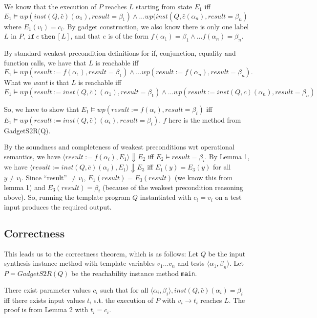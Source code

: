 \documentclass[11pt]{article}
\begin{document}
We know that the execution of $P$ reaches $L$ starting from state $E_1$ iff
$E_1 \vDash wp(inst(Q, \bar{c})(\alpha_1), result = \beta_1) \wedge \ldots
wp(inst(Q,\bar{c}(\alpha_n), result = \beta_n)$ where $E_1(v_i) = c_i$.
%
By gadget construction, we also know there is only one label $L$ in $P$,
$\mathtt{if}~ e~ \mathtt{then}~[L]$, and that $e$ is of the form
$f(\alpha_1) = \beta_1 \wedge \ldots f(\alpha_n) = \beta_n$.

By standard weakest precondition definitions for if, conjunction, equality and
function calls, we have that $L$ is reachable iff
$E_1 \vDash wp(result := f(\alpha_1), result = \beta_1) \wedge \ldots wp(result
:= f(\alpha_n), result = \beta_n).$ What we \emph{want} is that $L$ is reachable
iff
$E_1 \vDash wp( result := inst(Q, \bar{c})(\alpha_1), result = \beta_1) \wedge
\ldots wp(result := inst(Q, c)(\alpha_n), result = \beta_n)$

So, we have to show that $E_1 \vDash wp(result := f(\alpha_i), result =
\beta_i)$ iff $E_1 \vDash wp(result := inst(Q, \bar{c})(\alpha_i), result =
\beta_i)$.  $f$ here is the method from GadgetS2R(Q).  

By the soundness and completeness of weakest preconditions wrt operational
semantics, we have $\langle result := f(\alpha_i), E_1\rangle \Downarrow E_2$
iff $E_2 \vDash result = \beta_i$.
%
By Lemma 1, we have $\langle result := inst(Q, \bar{c})(\alpha_i) ,
E_1 \rangle \Downarrow E_3$ iff $E_1(y)= E_3(y)$ for all $y \neq
v_i$.
%
Since ``result'' $\neq v_i$, $E_1(result) = E_3(result)$ (we know this from
lemma 1) and $E_3(result) = \beta_i$ (because of the weakest precondition
reasoning above). So, running the template program $Q$ instantiated with
$c_i = v_i$ on a test input produces the required output.

\subsection{Correctness}

This leads us to the correctness theorem, which is as follows: Let $Q$ be the
input synthesis instance method with template variables $v_1 ... v_n$ and tests
$\langle\alpha_1, \beta_n\rangle$. Let $P = GadgetS2R(Q)$ be the reachability
instance method \texttt{main}.

There exist parameter values $c_i$ such that for all
$\langle\alpha_i,\beta_i\rangle, inst(Q,\bar{c})(\alpha_i) = \beta_i$ iff there exists input
values $t_i$ s.t. the execution of $P$ with $v_i \rightarrow t_i$ reaches $L$.
The proof is from Lemma 2 with $t_i = c_i$. 
\end{document}

